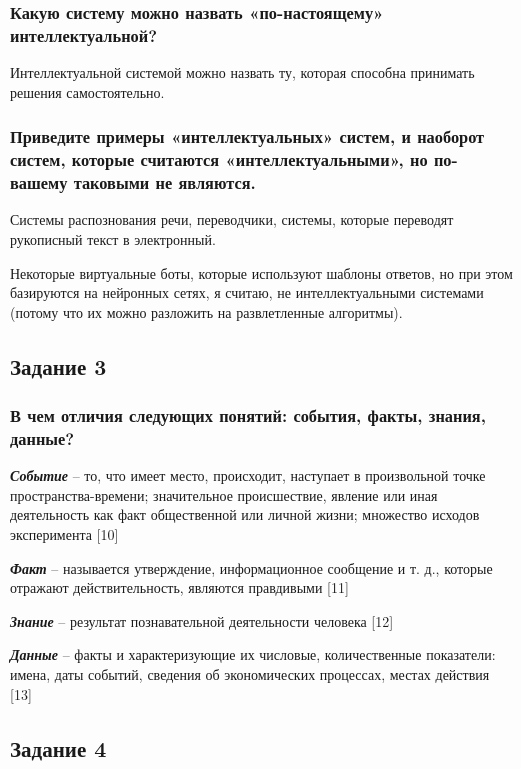 \documentclass[14pt,a4paper,report]{report}
\begin{document}
\subsubsection{Какую систему можно назвать «по-настоящему» интеллектуальной?}

Интеллектуальной системой можно назвать ту, которая способна принимать решения самостоятельно.

\subsubsection{Приведите примеры «интеллектуальных» систем, и наоборот систем, которые считаются «интеллектуальными», но по-вашему таковыми не являются.}

Системы распознования речи, переводчики, системы, которые переводят рукописный текст в электронный.

Некоторые виртуальные боты, которые используют шаблоны ответов, но при этом базируются на нейронных сетях, я считаю, не интеллектуальными системами (потому что их можно разложить на развлетленные алгоритмы).

\subsection{Задание 3}

\subsubsection{В чем отличия следующих понятий: события, факты, знания, данные?}

\emph{\textbf{Событие}} -- то, что имеет место, происходит, наступает в произвольной точке пространства-времени; значительное происшествие, явление или иная деятельность как факт общественной или личной жизни; множество исходов эксперимента [10]

\emph{\textbf{Факт}} -- называется утверждение, информационное сообщение и т. д., которые отражают действительность, являются правдивыми [11]

\emph{\textbf{Знание}} -- результат познавательной деятельности человека [12]

\emph{\textbf{Данные}} -- факты и характеризующие их числовые, количественные показатели: имена, даты событий, сведения об экономических процессах, местах действия [13]

\subsection{Задание 4}
\end{document}
